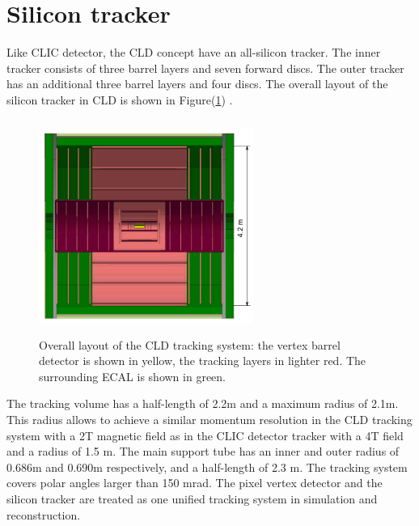 \section{Silicon tracker}
Like  CLIC detector, the CLD concept have  an all-silicon tracker. 
The inner tracker consists of three barrel layers and seven forward discs. The outer tracker
has  an additional three barrel layers and four discs. The overall layout of the silicon tracker in CLD is shown in Figure(\ref{fig:tracking}) .
\begin{figure}[ht]
    \centering
    \includegraphics[width = 7cm, height = 7cm]{fcc_det/ph6.png}
    \caption{ Overall layout of the CLD tracking system: the vertex barrel detector is shown in yellow, the
    tracking layers in lighter red.  The surrounding ECAL is shown in green.}
    \label{fig:tracking}
\end{figure}
The tracking volume has a half-length of 2.2m and a maximum radius of 2.1m. This radius allows to
achieve a similar momentum resolution in the CLD tracking system with a 2T magnetic field as in the CLIC detector  tracker with a 4T field and a radius of 1.5 m. The main support tube has an inner and outer radius of 0.686m and 0.690m respectively, and a half-length of 2.3 m.
The
tracking system covers polar angles larger than 150 mrad.
The pixel vertex detector and the silicon tracker are treated as one unified tracking system in simulation and reconstruction.

